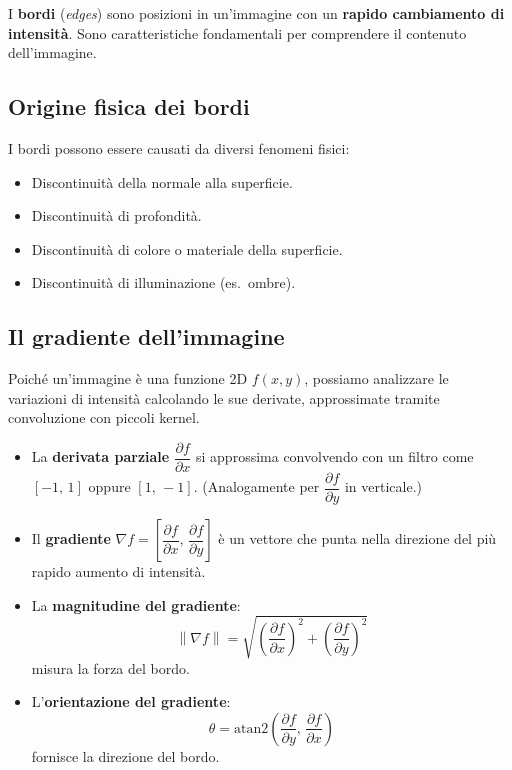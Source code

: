 \documentclass[12pt, a4paper]{report}
\newcommand{\norm}[1]{\left\lVert#1\right\rVert}
\begin{document}
\begin{defbox}[Bordi]
I \textbf{bordi} (\emph{edges}) sono posizioni in un'immagine con un
\textbf{rapido cambiamento di intensità}.  Sono caratteristiche fondamentali per
comprendere il contenuto dell'immagine.
\end{defbox}

\subsection{Origine fisica dei bordi}

I bordi possono essere causati da diversi fenomeni fisici:
\begin{itemize}
  \item Discontinuità della normale alla superficie.
  \item Discontinuità di profondità.
  \item Discontinuità di colore o materiale della superficie.
  \item Discontinuità di illuminazione (es.\ ombre).
\end{itemize}

\subsection{Il gradiente dell'immagine}

Poiché un'immagine è una funzione 2D $f(x,y)$, possiamo analizzare le variazioni
di intensità calcolando le sue derivate, approssimate tramite convoluzione con
piccoli kernel.

\begin{itemize}
  \item La \textbf{derivata parziale} $\dfrac{\partial f}{\partial x}$ si approssima
        convolvendo con un filtro come $[-1,\,1]$ oppure $[1,\,-1]$.
        (Analogamente per $\dfrac{\partial f}{\partial y}$ in verticale.)

  \item Il \textbf{gradiente} $\nabla f = \left[\dfrac{\partial f}{\partial x},\,
        \dfrac{\partial f}{\partial y}\right]$ è un vettore che punta nella direzione
        del più rapido aumento di intensità.

  \item La \textbf{magnitudine del gradiente}:
        \[
          \norm{\nabla f} = \sqrt{\left(\frac{\partial f}{\partial x}\right)^2 +
                                  \left(\frac{\partial f}{\partial y}\right)^2}
        \]
        misura la forza del bordo.

  \item L'\textbf{orientazione del gradiente}:
        \[
          \theta = \mathrm{atan2}\!\left(\frac{\partial f}{\partial y},\,
                                         \frac{\partial f}{\partial x}\right)
        \]
        fornisce la direzione del bordo.
\end{itemize}
\end{document}
